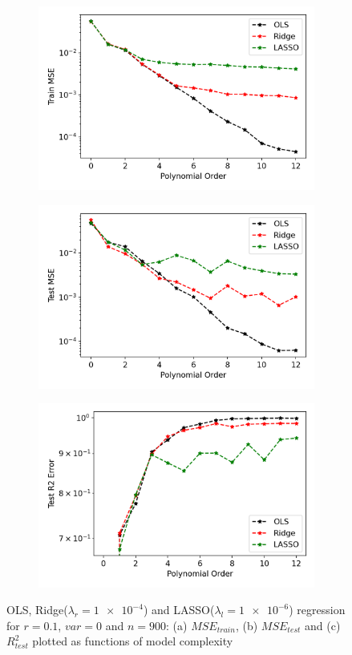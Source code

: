\begin{figure}[htb]
\centering
\begin{subfigure}{.5\textwidth}
  \centering
  \includegraphics[width=.9\linewidth]{Images/orl2.png}
  \caption{}
  \label{fig:orl1}
\end{subfigure}%
\begin{subfigure}{.5\textwidth}
  \centering
  \includegraphics[width=.9\linewidth]{Images/orl1.png}
  \caption{}
  \label{fig:orl2}
\end{subfigure}
\begin{subfigure}{.5\textwidth}
  \centering
  \includegraphics[width=.9\linewidth]{Images/orl3.png}
  \caption{}
  \label{fig:orl3}
\end{subfigure}
\caption{OLS, Ridge($\lambda_r = \num{1e-4}$) and LASSO($\lambda_l = \num{1e-6}$) regression for $r=0.1$, $var=0$ and $n=900$: (a) $MSE_{train}$, (b) $MSE_{test}$ and (c) $R^2_{test}$ plotted as functions of model complexity}
\label{fig:ORL1}
\end{figure}

